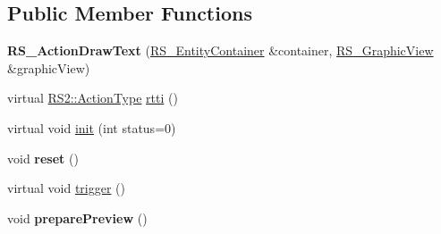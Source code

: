 \subsection*{Public Member Functions}
\begin{DoxyCompactItemize}
\item 
\hypertarget{classRS__ActionDrawText_a6d2de6cfaf6d0cfbeb1ed924e6827435}{{\bfseries R\-S\-\_\-\-Action\-Draw\-Text} (\hyperlink{classRS__EntityContainer}{R\-S\-\_\-\-Entity\-Container} \&container, \hyperlink{classRS__GraphicView}{R\-S\-\_\-\-Graphic\-View} \&graphic\-View)}\label{classRS__ActionDrawText_a6d2de6cfaf6d0cfbeb1ed924e6827435}

\item 
virtual \hyperlink{classRS2_afe3523e0bc41fd637b892321cfc4b9d7}{R\-S2\-::\-Action\-Type} \hyperlink{classRS__ActionDrawText_a73e6b294bf0ea7507468e5ba9f042c6f}{rtti} ()
\item 
virtual void \hyperlink{classRS__ActionDrawText_a91e74d20a7b8976f0c070823b64db6f9}{init} (int status=0)
\item 
\hypertarget{classRS__ActionDrawText_a02921e428cee2862bb970bf1f9a63b6c}{void {\bfseries reset} ()}\label{classRS__ActionDrawText_a02921e428cee2862bb970bf1f9a63b6c}

\item 
virtual void \hyperlink{classRS__ActionDrawText_af63c0fb27c8cbd0fc6a2947d53259f8d}{trigger} ()
\item 
\hypertarget{classRS__ActionDrawText_a64c4ea84c58d813ce463869f4784d92c}{void {\bfseries prepare\-Preview} ()}\label{classRS__ActionDrawText_a64c4ea84c58d813ce463869f4784d92c}


\end{DoxyCompactItemize}
